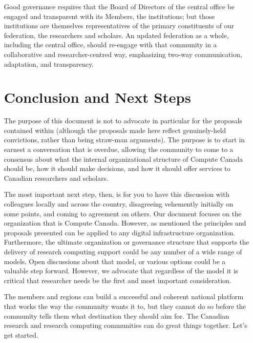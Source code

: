 \documentclass[11pt, letterpaper, twoside]{article}
\begin{document}
Good governance requires that the Board of Directors of the central
office be engaged and transparent with its Members, the institutions;
but those institutions are themselves representatives of the primary
constituents of our federation, the researchers and scholars. An updated
federation as a whole, including the central office, should re-engage
with that community in a collaborative and researcher-centred way,
emphasizing two-way communication, adaptation, and transparency.

\section*{Conclusion and Next Steps}
%

The purpose of this document is not to advocate in particular for the
proposals contained within (although the proposals made here reflect
genuinely-held convictions, rather than being straw-man arguments). The
purpose is to start in earnest a conversation that is overdue, allowing
the community to come to a consensus about what the internal
organizational structure of Compute Canada should be, how it should make
decisions, and how it should offer services to Canadian researchers and
scholars.

The most important next step, then, is for you to have this discussion
with colleagues locally and across the country, disagreeing vehemently
initially on some points, and coming to agreement on others. 
Our document focuses on the organization that is Compute Canada.
However, as mentioned the principles and proposals presented can be
applied to any digital infrastructure organization. Furthermore, the
ultimate organization or governance structure that supports the delivery
of research computing support could be any number of a wide range of
models. Open discussions about that model, or various options could be a
valuable step forward. However, we advocate that regardless of the model
it is critical that researcher needs be the first and most important
consideration.

The members and regions can build a successful and coherent national
platform that works the way the community wants it to, but they cannot
do so before the community tells them what destination they should aim
for. The Canadian research and research computing communities can do
great things together. Let's get started.

\newpage


%


\clearpage

\makebackcover
\end{document}
